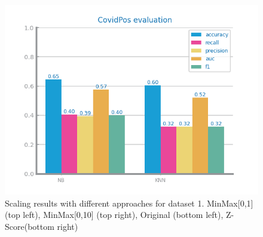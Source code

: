 \documentclass[10pt]{extarticle}
\begin{document}
\begin{figure}[H]
\includegraphics[scale=0.80]{images/dataset1/data_preparation/CovidPos_scaling_treat_Z-Score.png}
\caption{Scaling results with different approaches for dataset 1. MinMax[0,1] (top left), MinMax[0,10] (top right), Original (bottom left), Z-Score(bottom right)}
\end{figure}
\end{document}

